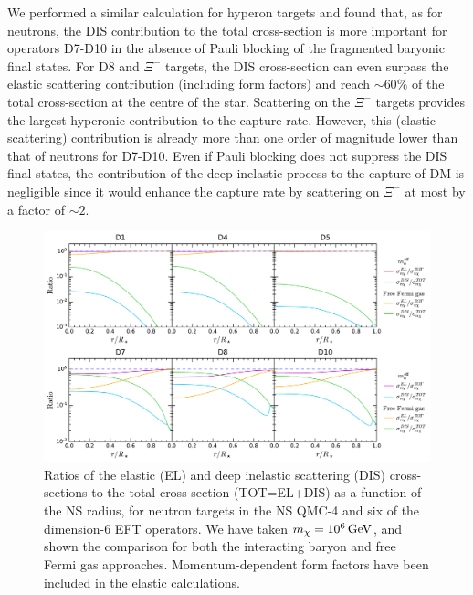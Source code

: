 We performed a similar calculation for hyperon targets and found that, as for neutrons, the DIS contribution to the total cross-section is more important for operators D7-D10 in the absence of Pauli blocking of the fragmented baryonic final states. For D8 and  $\Xi^-$ targets, the DIS cross-section can even surpass the elastic scattering contribution (including form factors) and reach $\sim60\%$ of the total cross-section at the centre of the star. Scattering on the $\Xi^-$ targets provides the largest hyperonic contribution to the capture rate. However, this (elastic scattering) contribution is already more than one order of magnitude lower than that of neutrons for D7-D10.  
Even if Pauli blocking does not suppress the DIS final states, the contribution of the deep inelastic process to the capture of DM is negligible since it would enhance the capture rate by scattering on $\Xi^-$ at most by a factor of $\sim2$. 

\begin{figure}[t!bp]
    \centering
    \includegraphics[width=\textwidth]{capture_3/DIS_xsectot_ratio_PeV.pdf}
    \caption[Ratios of the elastic (EL) and deep inelastic scattering (DIS) cross-sections to the total cross-section (TOT=EL+DIS) as a function of the NS radius, for neutron targets in the NS QMC-4 and six of the dimension-6 EFT operators.]{Ratios of the elastic (EL) and deep inelastic scattering (DIS) cross-sections to the total cross-section (TOT=EL+DIS) as a function of the NS radius, for neutron targets in the NS QMC-4 and six of the dimension-6 EFT operators.  We have taken $m_\chi=10^6{\rm \,GeV}$, and shown the comparison for both the interacting baryon and free Fermi gas approaches. Momentum-dependent form factors have been included in the elastic calculations.  }  
    \label{ch5:fig:DISratio}
\end{figure}

